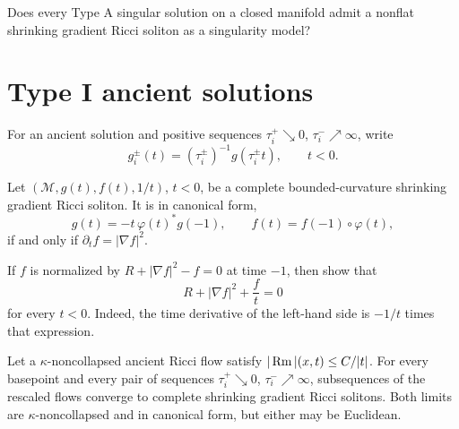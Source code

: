\begin{conjecture}
\label{conj:chow-iv-type-a-nonflat-shrinker-model}
Does every Type A singular solution on a closed manifold admit a nonflat
shrinking gradient Ricci soliton as a singularity model?
\end{conjecture}

\section{Type I ancient solutions}

For an ancient solution and positive sequences
\(\tau_i^+\searrow0\), \(\tau_i^-\nearrow\infty\), write
\[
 g_i^\pm(t)=(\tau_i^\pm)^{-1}g(\tau_i^\pm t),\qquad t<0.
\]

\begin{lemma}
\label{lem:chow-iv-shrinker-canonical-form-characterization}
Let \((\mathcal M,g(t),f(t),1/t)\), \(t<0\), be a complete
bounded-curvature shrinking gradient Ricci soliton.  It is in canonical form,
\[
 g(t)=-t\,\varphi(t)^*g(-1),\qquad
 f(t)=f(-1)\circ\varphi(t),
\]
if and only if \(\partial_t f=|\nabla f|^2\).
\end{lemma}

\begin{example}
\label{ex:chow-iv-shrinker-canonical-normalization}
If \(f\) is normalized by \(R+|\nabla f|^2-f=0\) at time \(-1\), then
show that
\[
 R+|\nabla f|^2+\frac ft=0
\]
for every \(t<0\).  Indeed, the time derivative of the left-hand side is
\(-1/t\) times that expression.
\end{example}

\begin{theorem}
\label{thm:chow-iv-type-i-ancient-asymptotic-shrinkers}
Let a \(\kappa\)-noncollapsed ancient Ricci flow satisfy
\(|\operatorname{Rm}|(x,t)\leq C/|t|\).  For every basepoint and every pair of sequences
\(\tau_i^+\searrow0\), \(\tau_i^-\nearrow\infty\), subsequences of the
rescaled flows converge to complete shrinking gradient Ricci solitons.  Both
limits are \(\kappa\)-noncollapsed and in canonical form, but either may be
Euclidean.
\end{theorem}

